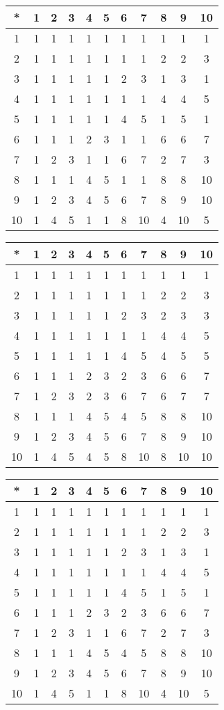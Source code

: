 \begin{tabular}[t]{c|cccccccccc}
*&1&2&3&4&5&6&7&8&9&10 \\ \hline
    1&1&1&1&1&1&1&1&1&1&1 \\
    2&1&1&1&1&1&1&1&2&2&3 \\
    3&1&1&1&1&1&2&3&1&3&1 \\
    4&1&1&1&1&1&1&1&4&4&5 \\
    5&1&1&1&1&1&4&5&1&5&1 \\
    6&1&1&1&2&3&1&1&6&6&7 \\
    7&1&2&3&1&1&6&7&2&7&3 \\
    8&1&1&1&4&5&1&1&8&8&10 \\
    9&1&2&3&4&5&6&7&8&9&10 \\
    10&1&4&5&1&1&8&10&4&10&5 
\end{tabular}


\begin{tabular}[t]{c|cccccccccc}
*&1&2&3&4&5&6&7&8&9&10 \\ \hline
    1&1&1&1&1&1&1&1&1&1&1 \\
    2&1&1&1&1&1&1&1&2&2&3 \\
    3&1&1&1&1&1&2&3&2&3&3 \\
    4&1&1&1&1&1&1&1&4&4&5 \\
    5&1&1&1&1&1&4&5&4&5&5 \\
    6&1&1&1&2&3&2&3&6&6&7 \\
    7&1&2&3&2&3&6&7&6&7&7 \\
    8&1&1&1&4&5&4&5&8&8&10 \\
    9&1&2&3&4&5&6&7&8&9&10 \\
    10&1&4&5&4&5&8&10&8&10&10 
\end{tabular}


\begin{tabular}[t]{c|cccccccccc}
*&1&2&3&4&5&6&7&8&9&10 \\ \hline
    1&1&1&1&1&1&1&1&1&1&1 \\
    2&1&1&1&1&1&1&1&2&2&3 \\
    3&1&1&1&1&1&2&3&1&3&1 \\
    4&1&1&1&1&1&1&1&4&4&5 \\
    5&1&1&1&1&1&4&5&1&5&1 \\
    6&1&1&1&2&3&2&3&6&6&7 \\
    7&1&2&3&1&1&6&7&2&7&3 \\
    8&1&1&1&4&5&4&5&8&8&10 \\
    9&1&2&3&4&5&6&7&8&9&10 \\
    10&1&4&5&1&1&8&10&4&10&5 
\end{tabular}


